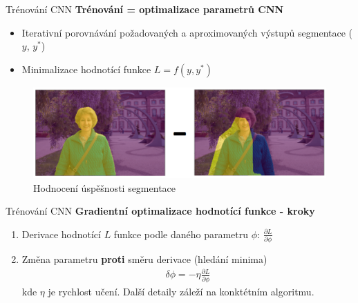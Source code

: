 \documentclass[aspectratio=1610]{beamer}
\begin{document}
\begin{frame}{Trénování CNN}
\textbf{Trénování = optimalizace parametrů CNN}

\begin{itemize}
	\item Iterativní porovnávání požadovaných a aproximovaných výstupů segmentace ($ y $, $ y^* $)
	\item Minimalizace hodnotící funkce $ L = f(y,y^*) $ 
\end{itemize}
\vspace{5mm}
\begin{figure}[h]
	\begin{center}
		\includegraphics[width=12cm, keepaspectratio]{comp.png}
	\end{center}
	\caption{Hodnocení úspěšnosti segmentace} 	
\end{figure}

\end{frame}
\begin{frame}{Trénování CNN}
\textbf{Gradientní optimalizace hodnotící funkce - kroky}

\begin{enumerate}
	\item Derivace hodnotící $ L $ funkce podle daného parametru $ \phi $: $ \frac{\partial L}{\partial \phi} $
	\item Změna parametru \textbf{proti} směru derivace (hledání minima)
	\begin{gather}
	\delta \phi = - \eta \frac{\partial L}{\partial \phi}
	\end{gather}	
	\noindent kde $ \eta $ je rychlost učení. Další detaily záleží na konktétním algoritmu.

\end{enumerate}

\end{frame}
\end{document}
